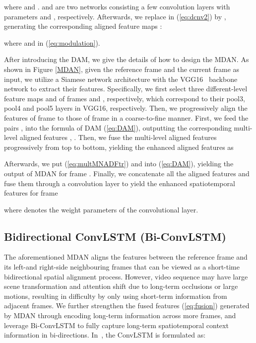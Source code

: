 \documentclass[review]{elsarticle}
\begin{document}
where  and .  and  are two networks consisting a few convolution layers with parameters  and , respectively.
Afterwards, we replace  in (\ref{eq:dcnv2}) by , generating the corresponding aligned feature maps :

where  and  in (\ref{eq:modulation}).





After introducing the DAM, we give the details of how to design the MDAN.
As shown in Figure \ref{MDAN}, given the reference frame  and the current frame  as input, we utilize a Siamese network architecture with the VGG16~\cite{simonyan2014very} backbone network to extract their features.
Specifically, we first select three different-level feature maps  and  of frames  and , respectively, which correspond to their pool3, pool4 and pool5 layers in VGG16, respectively.
Then, we progressively align the features of frame  to those of frame  in a coarse-to-fine manner.
First, we feed the pairs ,  into the formula of DAM (\ref{eq:DAM}), outputting the corresponding multi-level aligned features , .
Then, we fuse the multi-level aligned features progressively from top to bottom, yielding the enhanced aligned features as

Afterwards, we put  (\ref{eq:multMNADFtr}) and  into (\ref{eq:DAM}), yielding the output of MDAN  for frame .
Finally, we concatenate all the aligned features  and fuse them through a  convolution layer to yield the enhanced spatiotemporal features for frame 

where  denotes the weight parameters of the  convolutional layer.
\subsection{Bidirectional ConvLSTM (Bi-ConvLSTM)}
The aforementioned MDAN aligns the features between the reference frame and its left-and right-side neighbouring frames that can be viewed as a short-time bidirectional spatial alignment process.
However, video sequence may have large scene transformation and attention shift due to long-term occlusions or large motions, resulting in difficulty by only using short-term information from adjacent frames.
We further strengthen the fused features  (\ref{eq:fusion}) generated by MDAN through encoding long-term information across more frames, and leverage Bi-ConvLSTM to fully capture long-term spatiotemporal context information in bi-directions.
In~\cite{xingjian2015convolutional}, the ConvLSTM is formulated as:
\end{document}
